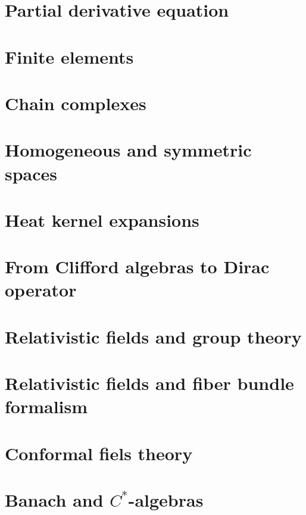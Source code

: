 \documentclass[a4paper,twoside,11pt]{book}
\begin{document}
\chapter{Partial derivative equation}


\chapter{Finite elements}


\chapter{Chain complexes}


\chapter{Homogeneous and symmetric spaces}




\chapter{Heat kernel expansions}


\chapter{From Clifford algebras to Dirac operator}



\chapter{Relativistic fields and group theory}


\chapter{Relativistic fields and fiber bundle formalism}


\chapter{Conformal fiels theory}


\chapter{Banach and \texorpdfstring{$C^*$}{C*}-algebras}
   
   
   
\end{document}

